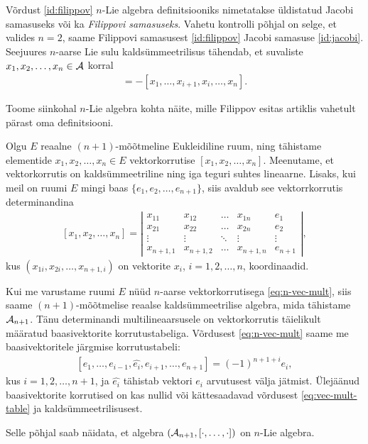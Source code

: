 Võrdust \eqref{id:filippov} $n$-Lie algebra definitsiooniks
nimetatakse üldistatud Jacobi samasuseks või ka
\emph{Filippovi samasuseks}. Vahetu kontrolli põhjal
on selge, et valides $n = 2$, saame Filippovi samasusest
\eqref{id:filippov} Jacobi samasuse \eqref{id:jacobi}. Seejuures
$n$-aarse Lie sulu kaldsümmeetrilisus tähendab, et
suvaliste $x_1, x_2, \dots, x_n \in \mathcal{A}$ korral
\begin{align*}
    [x_1, \dots, x_i, x_{i+1}, \dots, x_n] =
    -[x_1, \dots, x_{i+1}, x_i, \dots, x_n].
\end{align*}

Toome siinkohal $n$-Lie algebra kohta näite, mille
Filippov esitas artiklis \cite{filippov1985} vahetult
pärast oma definitsiooni.

\begin{naide}
    Olgu $E$ reaalne $(n+1)$-mõõtmeline Eukleidiline ruum,
    ning tähistame elementide $x_1, x_2, \dots, x_n \in E$
    vektorkorrutise $[x_1, x_2, \dots, x_n]$. Meenutame, 
    et vektorkorrutis on kaldsümmeetriline ning iga teguri
    suhtes lineaarne. Lisaks, kui meil on ruumi $E$ mingi
    baas $\{e_1, e_2, \dots, e_{n+1}\}$, siis avaldub see
    vektorrkorrutis determinandina
    \begin{align}\label{eq:n-vec-mult}
        [x_1, x_2, \dots, x_n] = \left|\begin{matrix}
          x_{11}    & x_{12}    & \dots  & x_{1n}    & e_1    \\
          x_{21}    & x_{22}    & \dots  & x_{2n}    & e_2    \\
          \vdots    & \vdots    & \ddots & \vdots    & \vdots \\
          x_{n+1,1} & x_{n+1,2} & \dots  & x_{n+1,n} & e_{n+1}
        \end{matrix}\right|,
    \end{align}
    kus $(x_{1i}, x_{2i}, \dots, x_{n+1,i})$ on vektorite
    $x_i$, $i = 1, 2, \dots, n$, koordinaadid.

    Kui me varustame ruumi $E$ nüüd $n$-aarse vektorkorrutisega
    \eqref{eq:n-vec-mult}, siis saame $(n+1)$-mõõtmelise
    reaalse kaldsümmeetrilise algebra, mida tähistame
    $\mathcal{A}_{n+1}$. Tänu determinandi multilineaarsusele on
    vektorkorrutis täielikult määratud baasivektorite
    korrutustabeliga. Võrdusest \eqref{eq:n-vec-mult} saame
    me baasivektoritele järgmise korrutustabeli:
    \begin{align}\label{eq:vec-mult-table}
        [e_1, \dots, e_{i-1}, \hat{e_i}, e_{i+1}, \dots, e_{n+1}]
        = (-1)^{n+1+i} e_i,
    \end{align}
    kus $i = 1, 2, \dots, n+1$, ja $\hat{e_i}$ tähistab
    vektori $e_i$ arvutusest välja jätmist. Ülejäänud
    baasivektorite korrutised on kas nullid või kättesaadavad
    võrdusest \eqref{eq:vec-mult-table} ja
    kaldsümmeetrilisusest.

    Selle põhjal saab näidata, et algebra
    $(\mathcal{A}_{n+1}, [\cdot, \dots, \cdot])$ on $n$-Lie
    algebra.\cite{filippov1985}
\end{naide}

